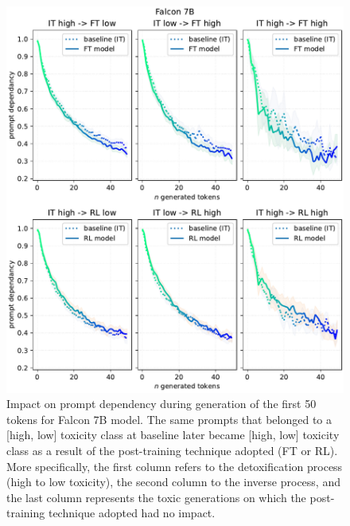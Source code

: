 \begin{figure}
    \centering
    \includegraphics[width=0.9\linewidth]{Figs/falcon-shifts.pdf}
    \caption{Impact on prompt dependency during generation of the first 50 tokens for Falcon 7B model. The same prompts that belonged to a [high, low] toxicity class at baseline later became [high, low] toxicity class as a result of the post-training technique adopted (FT or RL). More specifically, the first column refers to the detoxification process (high to low toxicity), the second column to the inverse process, and the last column represents the toxic generations on which the post-training technique adopted had no impact.}
    \label{fig:falcon-shift}
\end{figure}

